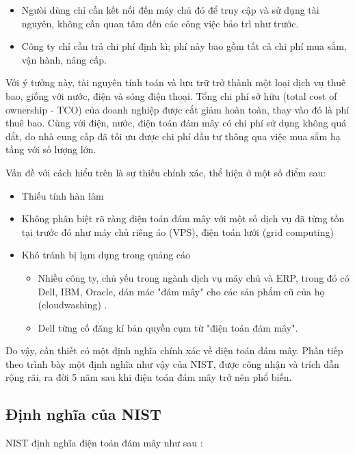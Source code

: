 \documentclass{article}
\begin{document}
\begin{itemize}
    \item Ngưòi dùng chỉ cần kết nối đến máy chủ đó để truy cập và sử dụng tài
    nguyên, không cần quan tâm đến các công việc bảo trì như trước.
    \item Công ty chỉ cần trả chi phí định kì; phí này bao gồm tất cả chi phí
    mua sắm, vận hành, nâng cấp.
\end{itemize}

Với ý tưởng này, tài nguyên tính toán và lưu trữ trở thành một loại dịch vụ thuê
bao, giống với nước, điện và sóng điện thoại. Tổng chi phí sở hữu (total cost of
ownership - TCO) của doanh nghiệp được cắt giảm hoàn toàn, thay vào đó là phí
thuê bao. Cùng với điện, nước, điện toán đám mây có chi phí sử dụng không quá
đắt, do nhà cung cấp đã tối ưu được chi phí đầu tư thông qua việc mua sắm hạ
tầng với số lượng lớn.

Vấn đề với cách hiểu trên là sự thiếu chính xác, thể hiện ở một số điểm sau:

\begin{itemize}
    \item Thiếu tính hàn lâm
    \item Không phân biệt rõ ràng điện toán đám mây với một số dịch vụ đã từng
    tồn tại trước đó như máy chủ riêng áo (VPS), điện toán lưới (grid computing)
    \item Khó tránh bị lạm dụng trong quảng cáo
    \begin{itemize}
        \item Nhiều công ty, chủ yếu trong ngành dịch vụ máy chủ và ERP, trong
        đó có Dell, IBM, Oracle, dán mác "đám mây" cho các sản phẩm cũ của họ
        (cloudwashing) \cite{MITTR2011}.
        \item  Dell từng cố đăng kí bản quyền cụm từ "điện toán đám
        mây".
    \end{itemize}
\end{itemize}

Do vậy, cần thiết có một định nghĩa chính xác về điện toán đám mây. Phần tiếp
theo trình bày một định nghĩa như vậy của NIST, được công nhận và trích dẫn rộng
rãi, ra đời 5 năm sau khi điện toán đám mây trở nên phổ biến.

\subsection{Định nghĩa của NIST}

NIST định nghĩa điện toán đám mây như sau \cite{NIST2011}:
\end{document}
